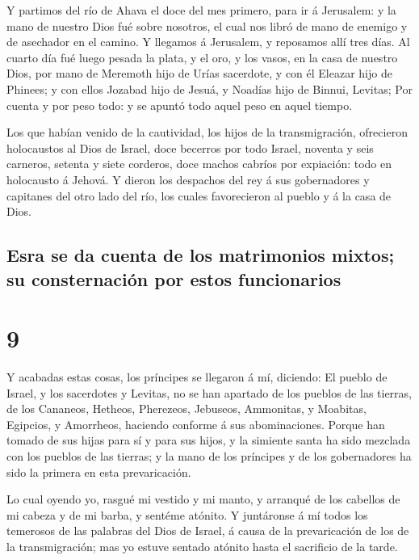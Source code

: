  Y partimos del río de Ahava el doce del mes primero,
para ir á Jerusalem: y la mano de nuestro Dios fué sobre nosotros, el
cual nos libró de mano de enemigo y de asechador en el camino.
 Y llegamos á Jerusalem, y reposamos allí tres días.
 Al cuarto día fué luego pesada la plata, y el oro, y los
vasos, en la casa de nuestro Dios, por mano de Meremoth hijo de Urías
sacerdote, y con él Eleazar hijo de Phinees; y con ellos Jozabad hijo de
Jesuá, y Noadías hijo de Binnui, Levitas;  Por cuenta y
por peso todo: y se apuntó todo aquel peso en aquel tiempo.

 Los que habían venido de la cautividad, los hijos de la
transmigración, ofrecieron holocaustos al Dios de Israel, doce becerros
por todo Israel, noventa y seis carneros, setenta y siete corderos, doce
machos cabríos por expiación: todo en holocausto á Jehová.
 Y dieron los despachos del rey á sus gobernadores y
capitanes del otro lado del río, los cuales favorecieron al pueblo y á
la casa de Dios.

\hypertarget{esra-se-da-cuenta-de-los-matrimonios-mixtos-su-consternaciuxf3n-por-estos-funcionarios}{%
\subsection{Esra se da cuenta de los matrimonios mixtos; su
consternación por estos
funcionarios}\label{esra-se-da-cuenta-de-los-matrimonios-mixtos-su-consternaciuxf3n-por-estos-funcionarios}}

\hypertarget{section-15-9}{%
\section{9}\label{section-15-9}}

 Y acabadas estas cosas, los príncipes se llegaron á mí,
diciendo: El pueblo de Israel, y los sacerdotes y Levitas, no se han
apartado de los pueblos de las tierras, de los Cananeos, Hetheos,
Pherezeos, Jebuseos, Ammonitas, y Moabitas, Egipcios, y Amorrheos,
haciendo conforme á sus abominaciones.  Porque han tomado
de sus hijas para sí y para sus hijos, y la simiente santa ha sido
mezclada con los pueblos de las tierras; y la mano de los príncipes y de
los gobernadores ha sido la primera en esta prevaricación.

 Lo cual oyendo yo, rasgué mi vestido y mi manto, y
arranqué de los cabellos de mi cabeza y de mi barba, y sentéme atónito.
 Y juntáronse á mí todos los temerosos de las palabras del
Dios de Israel, á causa de la prevaricación de los de la transmigración;
mas yo estuve sentado atónito hasta el sacrificio de la tarde.


